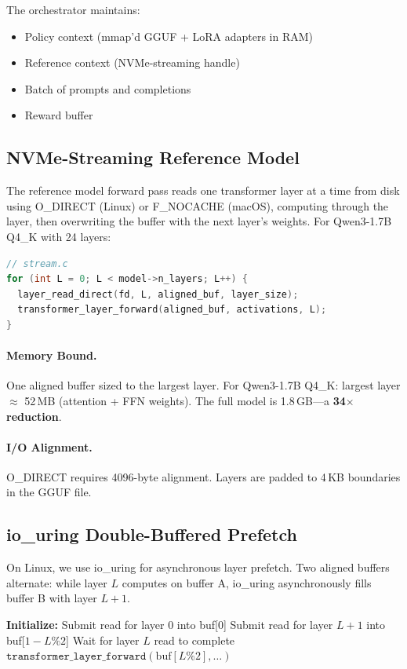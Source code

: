 \documentclass[sigconf,review,anonymous]{acmart}
\begin{document}
The orchestrator maintains:
\begin{itemize}
\item Policy context (mmap'd GGUF + LoRA adapters in RAM)
\item Reference context (NVMe-streaming handle)
\item Batch of prompts and completions
\item Reward buffer
\end{itemize}

\subsection{NVMe-Streaming Reference Model}

The reference model forward pass reads one transformer layer at a time from disk using O\_DIRECT (Linux) or F\_NOCACHE (macOS), computing through the layer, then overwriting the buffer with the next layer's weights. For Qwen3-1.7B Q4\_K with 24 layers:

\begin{lstlisting}[language=C]
// stream.c
for (int L = 0; L < model->n_layers; L++) {
  layer_read_direct(fd, L, aligned_buf, layer_size);
  transformer_layer_forward(aligned_buf, activations, L);
}
\end{lstlisting}

\paragraph{Memory Bound.} One aligned buffer sized to the largest layer. For Qwen3-1.7B Q4\_K: largest layer $\approx$ 52\,MB (attention + FFN weights). The full model is 1.8\,GB---a \textbf{34$\times$ reduction}.

\paragraph{I/O Alignment.} O\_DIRECT requires 4096-byte alignment. Layers are padded to 4\,KB boundaries in the GGUF file.

\subsection{io\_uring Double-Buffered Prefetch}

On Linux, we use io\_uring for asynchronous layer prefetch. Two aligned buffers alternate: while layer $L$ computes on buffer A, io\_uring asynchronously fills buffer B with layer $L+1$.

\begin{algorithm}
\caption{io\_uring Double-Buffered Layer Streaming}
\begin{algorithmic}[1]
\State \textbf{Initialize:} Submit read for layer 0 into buf[0]
  \State Submit read for layer $L+1$ into buf[$1-L\%2$] 
  \State Wait for layer $L$ read to complete
  \State $\texttt{transformer\_layer\_forward}(\text{buf}[L\%2], \ldots)$
\EndFor
\end{algorithmic}
\end{algorithm}
\end{document}
